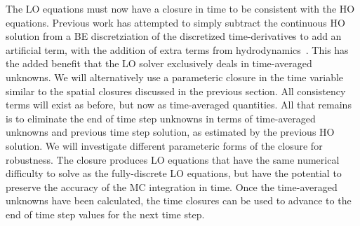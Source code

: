 The LO equations must now have a closure in time to be consistent with the HO equations. 
Previous work has attempted to simply subtract the continuous HO solution
from a BE discretziation of the discretized time-derivatives to add an artificial
term, with the addition of extra terms from hydrodynamics~\cite{holo_rh}.  This has the added benefit that the LO solver exclusively deals in
time-averaged unknowns.  We will alternatively use a parameteric closure in the time
variable similar to the spatial closures discussed in the previous section.  All
consistency terms will exist as before, but now as time-averaged quantities.  All that
remains is to eliminate the end of time step unknowns in terms of time-averaged
unknowns and previous time step solution, as estimated by the previous HO solution.  We
will investigate different parameteric forms of the closure for robustness.  The closure
produces LO equations that have the same numerical difficulty to solve as the fully-discrete LO equations, but
have the potential to preserve the accuracy of the MC integration in time.   Once the time-averaged unknowns have been calculated,
the time closures can be used to advance to the end of time step values for the next
time step.
%
%
